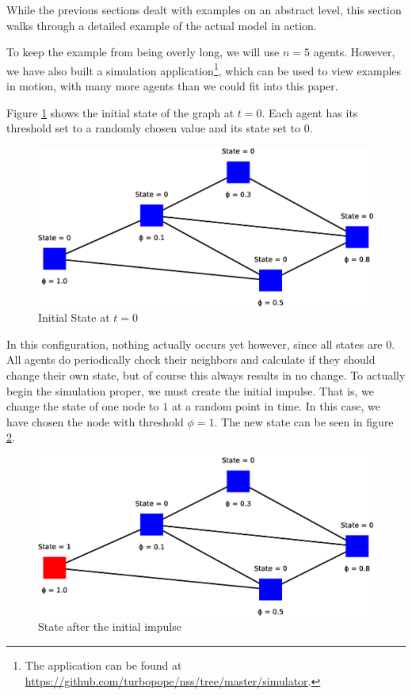 \documentclass{sig-alternate-05-2015}
\begin{document}
While the previous sections dealt with examples on an abstract level, this section walks through a detailed example of the actual model in action.

To keep the example from being overly long, we will use $n = 5$ agents. However, we have also built a simulation application\footnote{The application can be found at \url{https://github.com/turbopope/nss/tree/master/simulator}.}, which can be used to view examples in motion, with many more agents than we could fit into this paper.

Figure \ref{fig:model1} shows the initial state of the graph at $t = 0$. Each agent has its threshold set to a randomly chosen value and its state set to $0$.

\begin{figure}[h!]
    \includegraphics[width=\columnwidth]{../presentation/img/model4}
    \centering
    \caption{Initial State at $t = 0$}
    \label{fig:model1}
\end{figure}

In this configuration, nothing actually occurs yet however, since all states are $0$. All agents do periodically check their neighbors and calculate if they should change their own state, but of course this always results in no change. To actually begin the simulation proper, we must create the initial impulse. That is, we change the state of one node to $1$ at a random point in time. In this case, we have chosen the node with threshold $\phi = 1$. The new state can be seen in figure \ref{fig:model2}.

\begin{figure}[h!]
    \includegraphics[width=\columnwidth]{../presentation/img/model5}
    \centering
    \caption{State after the initial impulse}
    \label{fig:model2}
\end{figure}
\end{document}
